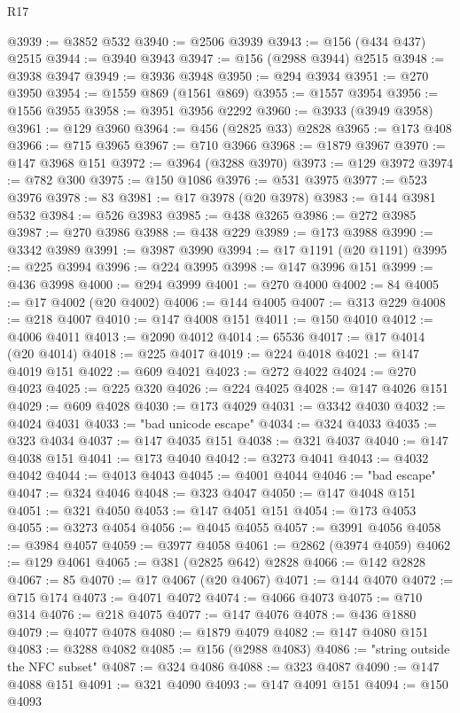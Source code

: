\begin{lexlean}{R17}
\begin{coremodule}
@3939 := @3852 @532
@3940 := @2506 @3939
@3943 := @156 (@434 @437) @2515
@3944 := @3940 @3943
@3947 := @156 (@2988 @3944) @2515
@3948 := @3938 @3947
@3949 := @3936 @3948
@3950 := @294 @3934
@3951 := @270 @3950
@3954 := @1559 @869 (@1561 @869)
@3955 := @1557 @3954
@3956 := @1556 @3955
@3958 := @3951 @3956 @2292
@3960 := @3933 (@3949 @3958)
@3961 := @129 @3960
@3964 := @456 (@2825 @33) @2828
@3965 := @173 @408
@3966 := @715 @3965
@3967 := @710 @3966
@3968 := @1879 @3967
@3970 := @147 @3968 @151
@3972 := @3964 (@3288 @3970)
@3973 := @129 @3972
@3974 := @782 @300
@3975 := @150 @1086
@3976 := @531 @3975
@3977 := @523 @3976
@3978 := 83
@3981 := @17 @3978 (@20 @3978)
@3983 := @144 @3981 @532
@3984 := @526 @3983
@3985 := @438 @3265
@3986 := @272 @3985
@3987 := @270 @3986
@3988 := @438 @229
@3989 := @173 @3988
@3990 := @3342 @3989
@3991 := @3987 @3990
@3994 := @17 @1191 (@20 @1191)
@3995 := @225 @3994
@3996 := @224 @3995
@3998 := @147 @3996 @151
@3999 := @436 @3998
@4000 := @294 @3999
@4001 := @270 @4000
@4002 := 84
@4005 := @17 @4002 (@20 @4002)
@4006 := @144 @4005
@4007 := @313 @229
@4008 := @218 @4007
@4010 := @147 @4008 @151
@4011 := @150 @4010
@4012 := @4006 @4011
@4013 := @2090 @4012
@4014 := 65536
@4017 := @17 @4014 (@20 @4014)
@4018 := @225 @4017
@4019 := @224 @4018
@4021 := @147 @4019 @151
@4022 := @609 @4021
@4023 := @272 @4022
@4024 := @270 @4023
@4025 := @225 @320
@4026 := @224 @4025
@4028 := @147 @4026 @151
@4029 := @609 @4028
@4030 := @173 @4029
@4031 := @3342 @4030
@4032 := @4024 @4031
@4033 := "bad unicode escape"
@4034 := @324 @4033
@4035 := @323 @4034
@4037 := @147 @4035 @151
@4038 := @321 @4037
@4040 := @147 @4038 @151
@4041 := @173 @4040
@4042 := @3273 @4041
@4043 := @4032 @4042
@4044 := @4013 @4043
@4045 := @4001 @4044
@4046 := "bad escape"
@4047 := @324 @4046
@4048 := @323 @4047
@4050 := @147 @4048 @151
@4051 := @321 @4050
@4053 := @147 @4051 @151
@4054 := @173 @4053
@4055 := @3273 @4054
@4056 := @4045 @4055
@4057 := @3991 @4056
@4058 := @3984 @4057
@4059 := @3977 @4058
@4061 := @2862 (@3974 @4059)
@4062 := @129 @4061
@4065 := @381 (@2825 @642) @2828
@4066 := @142 @2828
@4067 := 85
@4070 := @17 @4067 (@20 @4067)
@4071 := @144 @4070
@4072 := @715 @174
@4073 := @4071 @4072
@4074 := @4066 @4073
@4075 := @710 @314
@4076 := @218 @4075
@4077 := @147 @4076
@4078 := @436 @1880
@4079 := @4077 @4078
@4080 := @1879 @4079
@4082 := @147 @4080 @151
@4083 := @3288 @4082
@4085 := @156 (@2988 @4083)
@4086 := "string outside the NFC subset"
@4087 := @324 @4086
@4088 := @323 @4087
@4090 := @147 @4088 @151
@4091 := @321 @4090
@4093 := @147 @4091 @151
@4094 := @150 @4093

\end{coremodule}
\end{lexlean}
